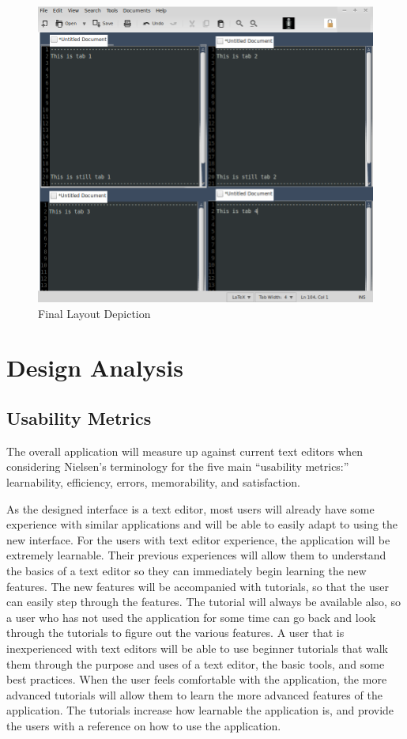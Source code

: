 \documentclass[11pt, oneside]{article}
\begin{document}
\begin{figure}[h!]
    \centering
    \includegraphics[width=1\textwidth]{photos/final_layout.png}
    \caption{Final Layout Depiction}
    \label{final}
\end{figure}

\section{Design Analysis}
\subsection{Usability Metrics}
The overall application will measure up against current text editors when considering Nielsen's terminology for the five main ``usability metrics:''  learnability, efficiency, errors, memorability, and satisfaction. 

As the designed interface is a text editor, most users will already have some experience with similar applications and will be able to easily adapt to using the new interface. For the users with text editor experience, the application will be extremely learnable. Their previous experiences will allow them to understand the basics of a text editor so they can immediately begin learning the new features. The new features will be accompanied with tutorials, so that the user can easily step through the features. The tutorial will always be available also, so a user who has not used the application for some time can go back and look through the tutorials to figure out the various features. A user that is inexperienced with text editors will be able to use beginner tutorials that walk them through the purpose and uses of a text editor, the basic tools, and some best practices. When the user feels comfortable with the application, the more advanced tutorials will allow them to learn the more advanced features of the application. The tutorials increase how learnable the application is, and provide the users with a reference on how to use the application.
\end{document}
